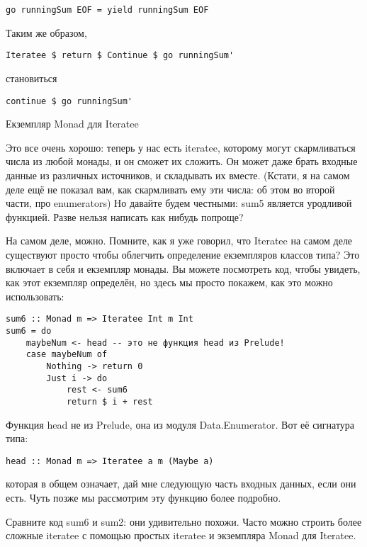 \begin{lstlisting}
go runningSum EOF = yield runningSum EOF
\end{lstlisting}

Таким же образом,

\begin{lstlisting}
Iteratee $ return $ Continue $ go runningSum'
\end{lstlisting}

становиться

\begin{lstlisting}
continue $ go runningSum'
\end{lstlisting}

Екземпляр Monad для Iteratee

Это все очень хорошо: теперь у нас есть iteratee, которому могут скармливаться числа из любой монады, и он сможет их сложить. Он может даже брать входные данные из различных источников, и складывать их вместе. (Кстати, я на самом деле ещё не показал вам, как скармливать ему эти числа: об этом во второй части, про enumerators) Но давайте будем честными: sum5 является уродливой функцией. Разве нельзя написать как нибудь попроще?

На самом деле, можно. Помните, как я уже говорил, что Iteratee на самом деле существуют просто чтобы облегчить определение екземпляров классов типа? Это включает в себя и екземпляр монады. Вы можете посмотреть код, чтобы увидеть, как этот екземпляр определён, но здесь мы просто покажем, как это можно использовать:

\begin{lstlisting}
sum6 :: Monad m => Iteratee Int m Int
sum6 = do
    maybeNum <- head -- это не функция head из Prelude!
    case maybeNum of
        Nothing -> return 0
        Just i -> do
            rest <- sum6
            return $ i + rest
\end{lstlisting}

Функция head не из Prelude, она из модуля Data.Enumerator. Вот её сигнатура типа:

\begin{lstlisting}
head :: Monad m => Iteratee a m (Maybe a)
\end{lstlisting}

которая в общем означает, дай мне следующую часть входных данных, если они есть. Чуть позже мы рассмотрим эту функцию более подробно.

Сравните код sum6 и sum2: они удивительно похожи. Часто можно строить более сложные iteratee с помощью простых iteratee и экземпляра Monad для Iteratee.

